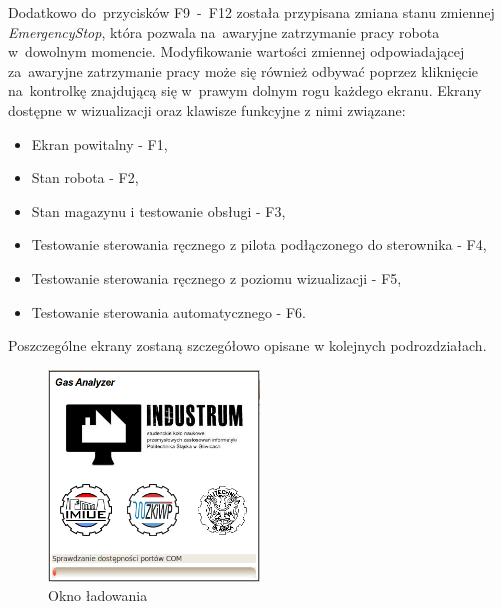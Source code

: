 Dodatkowo do~przycisków F9~-~F12 została przypisana zmiana stanu zmiennej \emph{EmergencyStop}, która pozwala na~awaryjne zatrzymanie pracy robota w~dowolnym momencie. Modyfikowanie wartości zmiennej odpowiadającej za~awaryjne zatrzymanie pracy może się również odbywać poprzez kliknięcie na~kontrolkę znajdującą się w~prawym dolnym rogu każdego ekranu.
Ekrany dostępne w wizualizacji oraz klawisze funkcyjne z nimi związane:
\begin{itemize} 
\item Ekran powitalny - F1,
\item Stan robota - F2,
\item Stan magazynu i testowanie obsługi - F3,
\item Testowanie sterowania ręcznego z pilota podłączonego do sterownika - F4,
\item Testowanie sterowania ręcznego z poziomu wizualizacji - F5,
\item Testowanie sterowania automatycznego - F6.
\end{itemize}
\indent
\indent Poszczególne ekrany zostaną szczegółowo opisane w kolejnych podrozdziałach.
\begin{figure}[!htb] 	\centering 	\includegraphics[width=0.5\textwidth]{images/splashScreen.png} \caption{Okno ładowania} \label{template} \end{figure}
